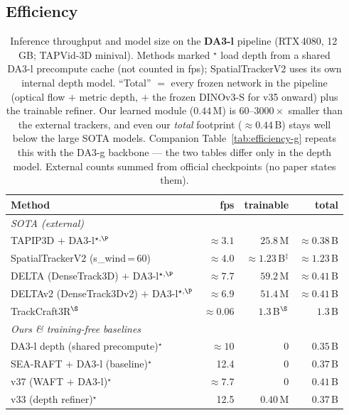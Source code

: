 \documentclass[11pt,a4paper]{article}
\begin{document}
\subsection{Efficiency}
\begin{table}[h]
\centering
\caption{Inference throughput and model size on the \textbf{DA3-l} pipeline (RTX\,4080, 12\,GB;
         TAPVid-3D minival). Methods marked $^{\star}$ load depth from a shared DA3-l precompute cache
         (not counted in fps); SpatialTrackerV2 uses its own internal depth model.
         ``Total'' $=$ every frozen network in the pipeline (optical flow $+$ metric depth, $+$ the frozen
         DINOv3-S for v35 onward) plus the trainable refiner. Our learned module ($0.44$\,M) is
         $60$--$3000\times$ smaller than the external trackers, and even our \emph{total} footprint
         (${\approx}0.44$\,B) stays well below the large SOTA models. Companion Table~\ref{tab:efficiency-g}
         repeats this with the DA3-g backbone --- the two tables differ only in the depth model.
         External counts summed from official checkpoints (no paper states them).}
\label{tab:efficiency}
\begin{tabular}{lrrr}
\toprule
Method & fps & trainable & total \\
\midrule
\multicolumn{4}{l}{\emph{SOTA (external)}} \\
TAPIP3D $+$ DA3-l$^{\star,\P}$          & ${\approx}3.1$  & $25.8$\,M & ${\approx}0.38$\,B \\
SpatialTrackerV2 (s\_wind\,=\,60)      & ${\approx}4.0$  & ${\approx}1.23$\,B$^{\ddagger}$ & ${\approx}1.23$\,B \\
DELTA (DenseTrack3D) $+$ DA3-l$^{\star,\P}$ & ${\approx}7.7$  & $59.2$\,M & ${\approx}0.41$\,B \\
DELTAv2 (DenseTrack3Dv2) $+$ DA3-l$^{\star,\P}$ & ${\approx}6.9$  & $51.4$\,M & ${\approx}0.41$\,B \\
TrackCraft3R$^{\S}$                    & ${\approx}0.06$ & $1.3$\,B$^{\S}$ & $1.3$\,B \\
\midrule
\multicolumn{4}{l}{\emph{Ours \& training-free baselines}} \\
DA3-l depth (shared precompute)$^{\star}$ & ${\approx}10$   & 0 & $0.35$\,B \\
SEA-RAFT $+$ DA3-l (baseline)$^{\star}$   & 12.4            & 0 & $0.37$\,B \\
v37 (WAFT $+$ DA3-l)$^{\star}$            & ${\approx}7.7$  & 0 & $0.41$\,B \\
v33 (depth refiner)$^{\star}$            & 12.5            & $0.40$\,M & $0.37$\,B \\

\end{tabular}
\end{table}
\end{document}
